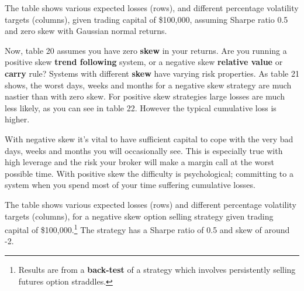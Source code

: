 The table shows various expected losses (rows), and different percentage volatility targets (columns), given trading capital of \$100,000, assuming Sharpe ratio 0.5 and zero skew with Gaussian normal returns.

Now, table 20 assumes you have zero \textbf{skew} in your returns. Are you running a positive skew \textbf{trend following} system, or a negative skew \textbf{relative value} or \textbf{carry} rule? Systems with different \textbf{skew} have varying risk properties. As table 21 shows, the worst days, weeks and months for a negative skew strategy are much nastier than with zero skew. For positive skew strategies large losses are much less likely, as you can see in table 22. However the typical cumulative loss is higher.

With negative skew it's vital to have sufficient capital to cope with the very bad days, weeks and months you will occasionally see. This is especially true with high leverage and the risk your broker will make a margin call at the worst possible time. With positive skew the difficulty is psychological; committing to a system when you spend most of your time suffering cumulative losses.

 \begingroup \small \centering
{}
\par \endgroup

The table shows various expected losses (rows) and different percentage volatility targets (columns), for a negative skew option selling strategy given trading capital of \$100,000.\footnote{Results are from a \textbf{back-test} of a strategy which involves persistently selling futures option straddles.} The strategy has a Sharpe ratio of 0.5 and skew of around -2.

